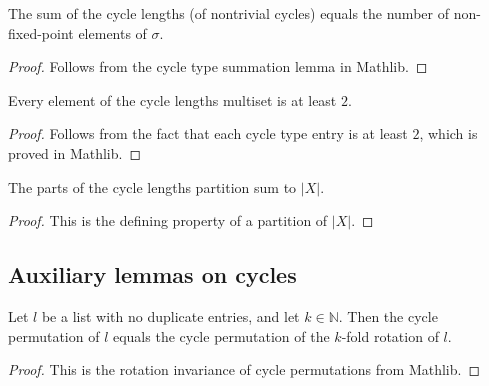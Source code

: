 \begin{lemma}
\label{lem.cycleLengths_sum}
\leanhelper
\leanok
The sum of the cycle lengths (of nontrivial cycles) equals the number of
non-fixed-point elements of $\sigma$.
\end{lemma}

\begin{proof}
\leanok
Follows from the cycle type summation lemma in Mathlib.
\end{proof}

\begin{lemma}
\label{lem.cycleLengths_mem_ge_two}
\leanhelper
\leanok
Every element of the cycle lengths multiset is at least $2$.
\end{lemma}

\begin{proof}
\leanok
Follows from the fact that each cycle type entry is at least $2$, which is proved in Mathlib.
\end{proof}

\begin{lemma}
\label{lem.cycleLengthsPartition_sum}
\leanhelper
\leanok
The parts of the cycle lengths partition sum to $|X|$.
\end{lemma}

\begin{proof}
\leanok
This is the defining property of a partition of $|X|$.
\end{proof}

\subsection{Auxiliary lemmas on cycles}

\begin{lemma}
\label{lem.cyc_rotate_eq}
\leanhelper
\leanok
Let $l$ be a list with no duplicate entries, and let $k \in \mathbb{N}$.
Then the cycle permutation of $l$ equals the cycle permutation of the
$k$-fold rotation of $l$.
\end{lemma}

\begin{proof}
\leanok
This is the rotation invariance of cycle permutations from Mathlib.
\end{proof}

